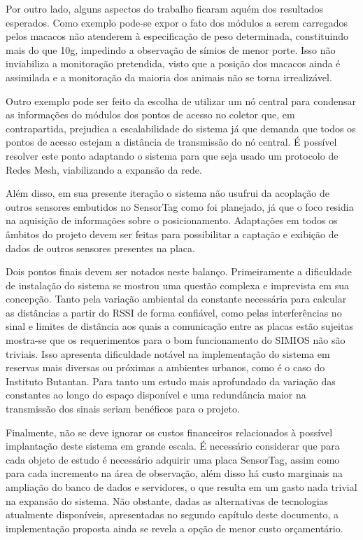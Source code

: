 Por outro lado, alguns aspectos do trabalho ficaram aquém dos resultados esperados. Como exemplo pode-se expor o fato dos módulos a serem carregados pelos macacos não atenderem à especificação de peso determinada, constituindo mais do que 10g, impedindo a observação de símios de menor porte. Isso não inviabiliza a monitoração pretendida, visto que a posição dos macacos ainda é assimilada e a monitoração da maioria dos animais não se torna irrealizável.

Outro exemplo pode ser feito da escolha de utilizar um nó central para condensar as informações do módulos dos pontos de acesso no coletor que, em contrapartida, prejudica a escalabilidade do sistema já que demanda que todos os pontos de acesso estejam a distância de transmissão do nó central. É possível resolver este ponto adaptando o sistema para que seja usado um protocolo de Redes Mesh, viabilizando a expansão da rede.

Além disso, em sua presente iteração o sistema não usufrui da acoplação de outros sensores embutidos no SensorTag como foi planejado, já que o foco residia na aquisição de informações sobre o posicionamento. Adaptações em todos os âmbitos do projeto devem ser feitas para possibilitar a captação e exibição de dados de outros sensores presentes na placa.

Dois pontos finais devem ser notados neste balanço. Primeiramente a dificuldade de instalação do sistema se mostrou uma questão complexa e imprevista em sua concepção. Tanto pela variação ambiental da constante necessária para calcular as distâncias a partir do RSSI de forma confiável, como pelas interferências no sinal e limites de distância aos quais a comunicação entre as placas estão sujeitas mostra-se que os requerimentos para o bom funcionamento do SIMIOS não são triviais. Isso apresenta dificuldade notável na implementação do sistema em reservas mais diversas ou próximas a ambientes urbanos, como é o caso do Instituto Butantan. Para tanto um estudo mais aprofundado da variação das constantes ao longo do espaço disponível e uma redundância maior na transmissão dos sinais seriam benéficos para o projeto.

Finalmente, não se deve ignorar os custos financeiros relacionados à possível implantação deste sistema em grande escala. É necessário considerar que para cada objeto de estudo é necessário adquirir uma placa SensorTag, assim como para cada incremento na área de observação, além disso há custo marginais na ampliação do banco de dados e servidores, o que resulta em um gasto nada trivial na expansão do sistema. Não obstante, dadas as alternativas de tecnologias atualmente disponíveis, apresentadas no segundo capítulo deste documento, a implementação proposta ainda se revela a opção de menor custo orçamentário.

